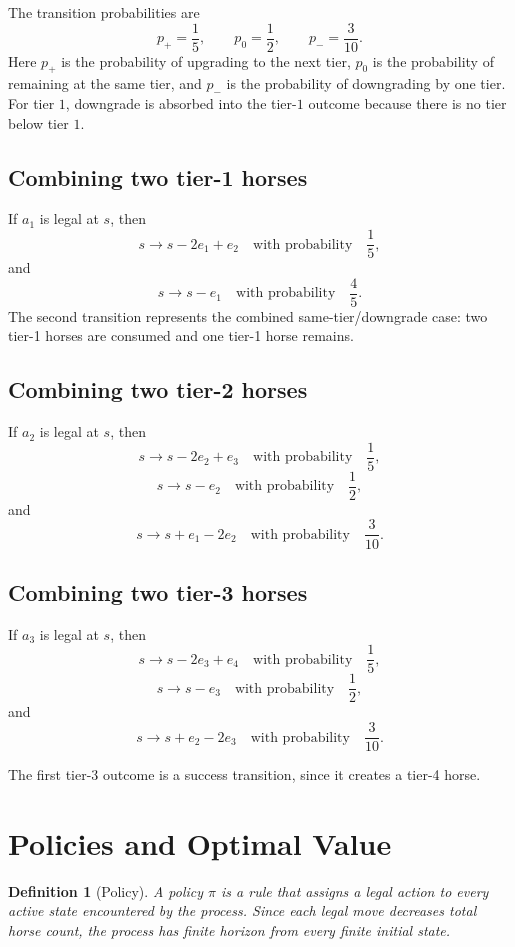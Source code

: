 \documentclass[11pt]{article}
\newtheorem{definition}[theorem]{Definition}
\begin{document}
The transition probabilities are
\[
    p_+ = \frac15,\qquad
    p_0 = \frac12,\qquad
    p_- = \frac3{10}.
\]
Here \(p_+\) is the probability of upgrading to the next tier, \(p_0\) is the probability of remaining at the same tier, and \(p_-\) is the probability of downgrading by one tier.  For tier \(1\), downgrade is absorbed into the tier-\(1\) outcome because there is no tier below tier \(1\).

\subsection{Combining two tier-1 horses}

If \(a_1\) is legal at \(s\), then
\[
    s \longrightarrow s-2e_1+e_2
    \quad\text{with probability}\quad \frac15,
\]
and
\[
    s \longrightarrow s-e_1
    \quad\text{with probability}\quad \frac45.
\]
The second transition represents the combined same-tier/downgrade case: two tier-1 horses are consumed and one tier-1 horse remains.

\subsection{Combining two tier-2 horses}

If \(a_2\) is legal at \(s\), then
\[
    s \longrightarrow s-2e_2+e_3
    \quad\text{with probability}\quad \frac15,
\]
\[
    s \longrightarrow s-e_2
    \quad\text{with probability}\quad \frac12,
\]
and
\[
    s \longrightarrow s+e_1-2e_2
    \quad\text{with probability}\quad \frac3{10}.
\]

\subsection{Combining two tier-3 horses}

If \(a_3\) is legal at \(s\), then
\[
    s \longrightarrow s-2e_3+e_4
    \quad\text{with probability}\quad \frac15,
\]
\[
    s \longrightarrow s-e_3
    \quad\text{with probability}\quad \frac12,
\]
and
\[
    s \longrightarrow s+e_2-2e_3
    \quad\text{with probability}\quad \frac3{10}.
\]

The first tier-3 outcome is a success transition, since it creates a tier-4 horse.

\section{Policies and Optimal Value}

\begin{definition}[Policy]
A policy \(\pi\) is a rule that assigns a legal action to every active state encountered by the process.  Since each legal move decreases total horse count, the process has finite horizon from every finite initial state.
\end{definition}
\end{document}

